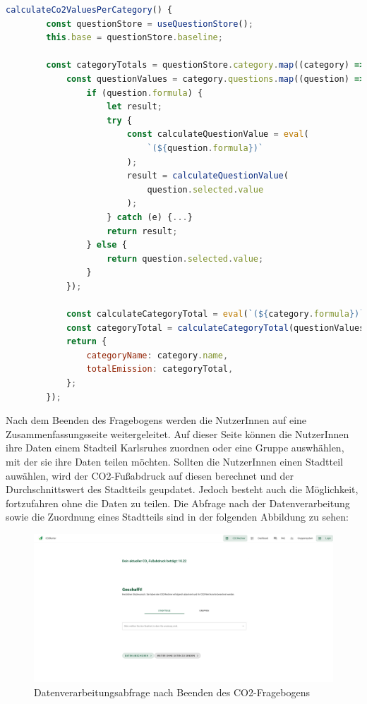 \begin{lstlisting}[language={JavaScript}, caption={Ausschnitt aus dem totalCo2Emission.ts - Store}]
calculateCo2ValuesPerCategory() {
        const questionStore = useQuestionStore();
        this.base = questionStore.baseline;

        const categoryTotals = questionStore.category.map((category) => {
            const questionValues = category.questions.map((question) => {
                if (question.formula) {
                    let result;
                    try {
                        const calculateQuestionValue = eval(
                            `(${question.formula})`
                        );
                        result = calculateQuestionValue(
                            question.selected.value
                        );
                    } catch (e) {...}
                    return result;
                } else {
                    return question.selected.value;
                }
            });
            
            const calculateCategoryTotal = eval(`(${category.formula})`);
            const categoryTotal = calculateCategoryTotal(questionValues);
            return {
                categoryName: category.name,
                totalEmission: categoryTotal,
            };
        });
\end{lstlisting}

Nach dem Beenden des Fragebogens werden die NutzerInnen auf eine Zusammenfassungsseite weitergeleitet. Auf dieser Seite können die NutzerInnen ihre Daten einem Stadteil Karlsruhes zuordnen oder eine Gruppe auswhählen, mit der sie ihre Daten teilen möchten. Sollten die NutzerInnen einen Stadtteil auwählen, wird der CO2-Fußabdruck auf diesen berechnet und der Durchschnittswert des Stadtteils geupdatet. Jedoch besteht auch die Möglichkeit, fortzufahren ohne die Daten zu teilen. Die Abfrage nach der Datenverarbeitung sowie die Zuordnung eines Stadtteils sind in der folgenden Abbildung zu sehen:

\begin{figure}[H]
    \centering
    \includegraphics[width=1\textwidth]{images/06/daten-verarbeitungs-seite.png}
    \caption{Datenverarbeitungsabfrage nach Beenden des CO2-Fragebogens}
    \label{fig:datenverarbeitungs-seite}
\end{figure}

